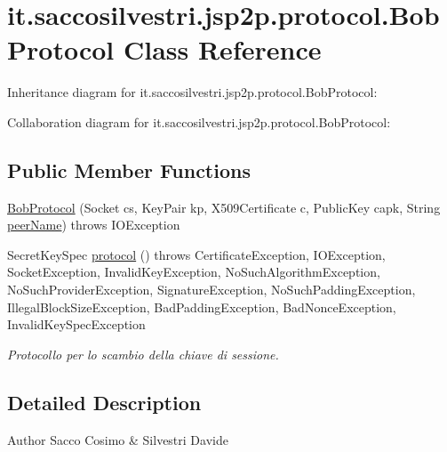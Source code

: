 \hypertarget{classit_1_1saccosilvestri_1_1jsp2p_1_1protocol_1_1_bob_protocol}{
\section{it.saccosilvestri.jsp2p.protocol.\-Bob\-Protocol \-Class \-Reference}
\label{classit_1_1saccosilvestri_1_1jsp2p_1_1protocol_1_1_bob_protocol}
}


\-Inheritance diagram for it.saccosilvestri.jsp2p.protocol.\-Bob\-Protocol\-:


\-Collaboration diagram for it.saccosilvestri.jsp2p.protocol.\-Bob\-Protocol\-:
\subsection*{\-Public \-Member \-Functions}
\begin{DoxyCompactItemize}
\item 
\hyperlink{classit_1_1saccosilvestri_1_1jsp2p_1_1protocol_1_1_bob_protocol_af19d99e7959d7a16d0a452a0f7bc692c}{\-Bob\-Protocol} (\-Socket cs, \-Key\-Pair kp, \-X509\-Certificate c, \-Public\-Key capk, \-String \hyperlink{classit_1_1saccosilvestri_1_1jsp2p_1_1protocol_1_1_protocol_a6dcf1366f63023a80091ab663ecd3060}{peer\-Name})  throws I\-O\-Exception 
\item 
\-Secret\-Key\-Spec \hyperlink{classit_1_1saccosilvestri_1_1jsp2p_1_1protocol_1_1_bob_protocol_af5e630fb51c6acf73adc5cd5a76017a2}{protocol} ()  throws Certificate\-Exception, I\-O\-Exception, 			\-Socket\-Exception, Invalid\-Key\-Exception, No\-Such\-Algorithm\-Exception, 			\-No\-Such\-Provider\-Exception, Signature\-Exception, 			\-No\-Such\-Padding\-Exception, Illegal\-Block\-Size\-Exception, 			\-Bad\-Padding\-Exception, Bad\-Nonce\-Exception, Invalid\-Key\-Spec\-Exception 
\begin{DoxyCompactList}\small\item\em \-Protocollo per lo scambio della chiave di sessione. \end{DoxyCompactList}\end{DoxyCompactItemize}


\subsection{\-Detailed \-Description}
\begin{DoxyAuthor}{\-Author}
\-Sacco \-Cosimo \& \-Silvestri \-Davide 
\end{DoxyAuthor}


